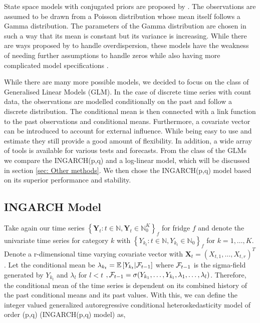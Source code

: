 State space models with conjugated priors are proposed by \cite{Harvey:1989}. The observations are assumed to be drawn from a Poisson distribution whose mean itself follows a Gamma distribution. The parameters of the Gamma distribution are chosen in such a way that its mean is constant but its variance is increasing. While there are ways proposed by \cite{Qaqish:1988} to handle overdispersion, these models have the weakness of needing further assumptions to handle zeros while also having more complicated model specifications \cite{Heinen:2003}.

While there are many more possible models, we decided to focus on the class of Generalised Linear Models (GLM). In the case of discrete time series with count data, the observations are modelled conditionally on the past and follow a discrete distribution. The conditional mean is then connected with a link function to the past observations and conditional means. Furthermore, a covariate vector can be introduced to account for external influence. While being easy to use and estimate they still provide a good amount of flexibility. In addition, a wide array of tools is available for various tests and forecasts. From the class of the GLMs we compare the INGARCH(p,q) and a log-linear model, which will be discussed in section \ref{sec: Other methods}. We then chose the INGARCH(p,q) model based on its superior performance and stability.


\subsection{INGARCH Model}
\label{sec:Ingarch Model}
Take again our time series $\left\{\bm{Y}_t:t\in \mathbb{N}, \bm{Y}_t \in \mathbb{N}_0^K \right\}_f$ for fridge $f$ and denote the univariate time series for category $k$ with $\left\{Y_{k_t}:t\in \mathbb{N}, Y_{k_t} \in \mathbb{N}_0\right\}_f$  for $k=1,\ldots,K$. Denote a r-dimensional time varying covariate vector with $\textbf{X}_t=(X_{t,1},\ldots,X_{t,r})^T$. Let the conditional mean be $\lambda_{k_t} = \mathbb{E}\left[Y_{k_t} | \mathcal{F}_{t-1} \right]$ where $\mathcal{F}_{t-1}$ is the sigma-field generated by $Y_{k_t}$ and $\lambda_l$ for $l<t$ $, \mathcal{F} _{t-1}= \sigma(Y_{k_1},\ldots,Y_{k_l},\lambda_1, \ldots, \lambda_l)$. Therefore, the conditional mean of the time series is dependent on its combined history of the past conditional means and its past values. With this, we can define the integer valued generalized autoregressive conditional heteroskedasticity model of order (p,q) (INGARCH(p,q) model) as,

